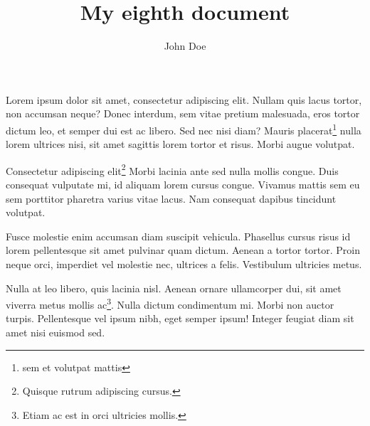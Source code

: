 \documentclass{article}
\title{My eighth document}
\author{John Doe}
\begin{document}
   \maketitle
   
   Lorem ipsum dolor sit amet, consectetur adipiscing elit. Nullam quis lacus tortor, non accumsan neque? Donec interdum, sem vitae pretium malesuada, eros tortor dictum leo, et semper dui est ac libero. Sed nec nisi diam? Mauris placerat\footnote{sem et volutpat mattis} nulla lorem ultrices nisi, sit amet sagittis lorem tortor et risus. Morbi augue volutpat. 
   
   Consectetur adipiscing elit\footnote{Quisque rutrum adipiscing cursus.} Morbi lacinia ante sed nulla mollis congue. Duis consequat vulputate mi, id aliquam lorem cursus congue. Vivamus mattis sem eu sem porttitor pharetra varius vitae lacus. Nam consequat dapibus tincidunt volutpat.
   
   Fusce molestie enim accumsan diam suscipit vehicula. Phasellus cursus risus id lorem pellentesque sit amet pulvinar quam dictum. Aenean a tortor tortor. Proin neque orci, imperdiet vel molestie nec, ultrices a felis. Vestibulum ultricies metus.
   
   Nulla at leo libero, quis lacinia nisl. Aenean ornare ullamcorper dui, sit amet viverra metus mollis ac\footnote{Etiam ac est in orci ultricies mollis.}. Nulla dictum condimentum mi. Morbi non auctor turpis. Pellentesque vel ipsum nibh, eget semper ipsum! Integer feugiat diam sit amet nisi euismod sed.
   
   \theendnotes
\end{document}
